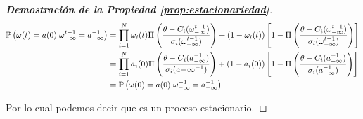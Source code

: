 \begin{proof}[\bf{Demostración de la Propiedad \ref{prop:estacionariedad}}]
\begin{align}
    \nonumber    \mathbb{P}\left(\omega(t)=a(0) | \omega_{-\infty}^{t-1}=a_{-\infty}^{-1}\right) &= \prod_{i=1}^N \omega_i(t) \Pi\left( \frac{\theta - C_i(\omega_{-\infty}^{t-1})}{\sigma_i(\omega_{-\infty}^{t-1})}\right)+(1-\omega_i(t)) \left[ 1-\Pi\left(\frac{\theta - C_i(\omega_{-\infty}^{t-1})}{\sigma_i(\omega_{-\infty}^{t-1})}\right)\right] \\
    \nonumber    & = \prod_{i=1}^N a_i(0) \Pi\left( \frac{\theta - C_i(a_{-\infty}^{-1})}{\sigma_i(a{-\infty}^{-1})}\right)+(1-a_i(0)) \left[ 1-\Pi\left(\frac{\theta - C_i(a_{-\infty}^{-1})}{\sigma_i(a_{-\infty}^{-1})}\right)\right] \\
    &=\mathbb{P}\left(\omega(0)=a(0) | \omega_{-\infty}^{-1}=a_{-\infty}^{-1}\right)
\end{align}

Por lo cual podemos decir que es un proceso estacionario.
\end{proof}